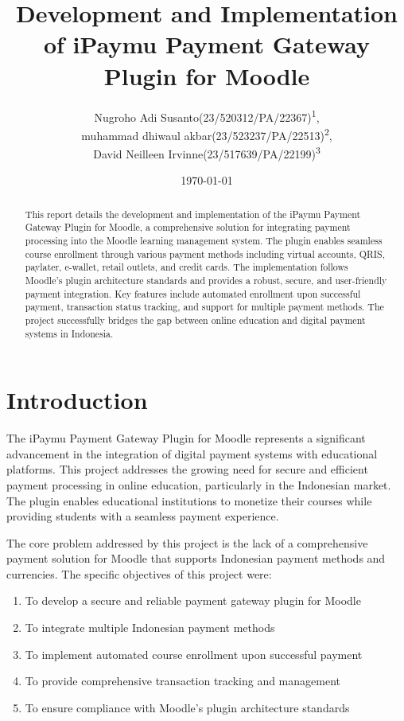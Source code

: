 \documentclass{article} %
\title{Development and Implementation of iPaymu Payment Gateway Plugin for Moodle}
\author{Nugroho Adi Susanto(23/520312/PA/22367)\textsuperscript{1}, \\ muhammad dhiwaul akbar(23/523237/PA/22513)\textsuperscript{2}, \\ David Neilleen Irvinne(23/517639/PA/22199)\textsuperscript{3} 
}
\date{\today}
\begin{document}
\maketitle %

\begin{abstract}
    This report details the development and implementation of the iPaymu Payment Gateway Plugin for Moodle, a comprehensive solution for integrating payment processing into the Moodle learning management system. The plugin enables seamless course enrollment through various payment methods including virtual accounts, QRIS, paylater, e-wallet, retail outlets, and credit cards. The implementation follows Moodle's plugin architecture standards and provides a robust, secure, and user-friendly payment integration. Key features include automated enrollment upon successful payment, transaction status tracking, and support for multiple payment methods. The project successfully bridges the gap between online education and digital payment systems in Indonesia.
\end{abstract}

\tableofcontents %
\newpage


\section{Introduction}
    The iPaymu Payment Gateway Plugin for Moodle represents a significant advancement in the integration of digital payment systems with educational platforms. This project addresses the growing need for secure and efficient payment processing in online education, particularly in the Indonesian market. The plugin enables educational institutions to monetize their courses while providing students with a seamless payment experience.

    The core problem addressed by this project is the lack of a comprehensive payment solution for Moodle that supports Indonesian payment methods and currencies. The specific objectives of this project were:
    \begin{enumerate}
        \item To develop a secure and reliable payment gateway plugin for Moodle
        \item To integrate multiple Indonesian payment methods
        \item To implement automated course enrollment upon successful payment
        \item To provide comprehensive transaction tracking and management
        \item To ensure compliance with Moodle's plugin architecture standards
    \end{enumerate}
\end{document}
